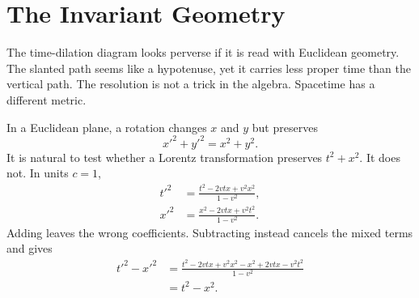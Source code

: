 \begin{classroomqa}
\end{classroomqa}

\begin{classroomqa}
\end{classroomqa}

\section{The Invariant Geometry}

The time-dilation diagram looks perverse if it is read with Euclidean geometry. The slanted path seems like a hypotenuse, yet it carries less proper time than the vertical path. The resolution is not a trick in the algebra. Spacetime has a different metric.

In a Euclidean plane, a rotation changes \(x\) and \(y\) but preserves
\begin{equation}
x'^2+y'^2=x^2+y^2.
\label{eq:sr1-euclidean-invariant}
\end{equation}
It is natural to test whether a Lorentz transformation preserves \(t^2+x^2\). It does not. In units \(c=1\),
\begin{align}
t'^2
&=\frac{t^2-2vtx+v^2x^2}{1-v^2},\\
x'^2
&=\frac{x^2-2vtx+v^2t^2}{1-v^2}.
\end{align}
Adding leaves the wrong coefficients. Subtracting instead cancels the mixed terms and gives
\begin{align}
t'^2-x'^2
&=
\frac{t^2-2vtx+v^2x^2-x^2+2vtx-v^2t^2}{1-v^2}\\
&=t^2-x^2.
\label{eq:sr1-interval-invariance}
\end{align}

